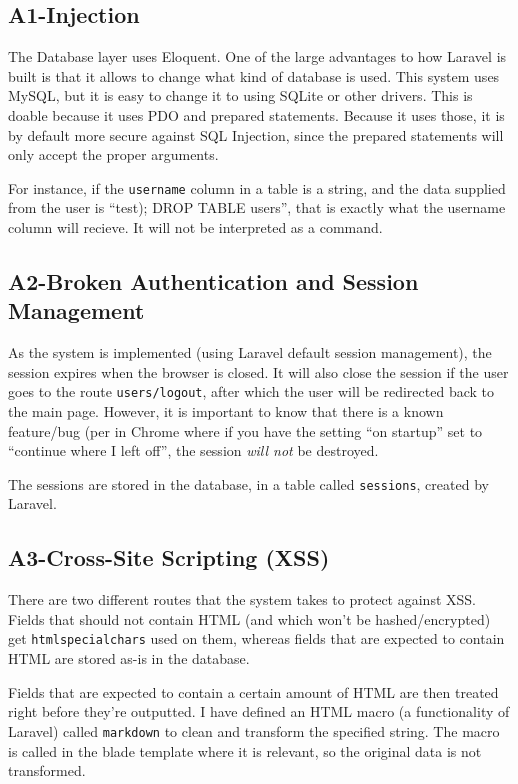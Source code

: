 \subsection{A1-Injection}
\noindent
The Database layer uses Eloquent. One of the large advantages to how Laravel is built is that it allows to change what kind of database is used. This system uses MySQL, but it is easy to change it to using SQLite or other drivers. This is doable because it uses PDO and prepared statements. Because it uses those, it is by default more secure against SQL Injection, since the prepared statements will only accept the proper arguments.

For instance, if the \texttt{username} column in a table is a string, and the data supplied from the user is ``test); DROP TABLE users'', that is exactly what the username column will recieve. It will not be interpreted as a command.

\subsection{A2-Broken Authentication and Session Management}
\noindent
As the system is implemented (using Laravel default session management), the session expires when the browser is closed. It will also close the session if the user goes to the route \texttt{users/logout}, after which the user will be redirected back to the main page. However, it is important to know that there is a known feature/bug (per \citep{Google2013cwili} in Chrome where if you have the  setting ``on startup'' set to ``continue where I left off'', the session \emph{will not} be destroyed.

The sessions are stored in the database, in a table called \texttt{sessions}, created by Laravel.

\subsection{A3-Cross-Site Scripting (XSS)}
\noindent
There are two different routes that the system takes to protect against XSS. Fields that should not contain HTML (and which won't be hashed/encrypted) get \texttt{htmlspecialchars} used on them, whereas fields that are expected to contain HTML are stored as-is in the database.

Fields that are expected to contain a certain amount of HTML are then treated right before they're outputted. I have defined an HTML macro (a functionality of Laravel) called \texttt{markdown} to clean and transform the specified string. The macro is called in the blade
template where it is relevant, so the original data is not transformed.

